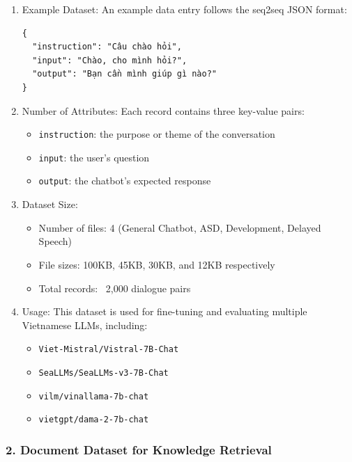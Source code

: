 \documentclass[conference]{IEEEtran}
\begin{document}
\begin{enumerate}[label=(\alph*)]
\item Example Dataset: 
An example data entry follows the seq2seq JSON format:

\begin{verbatim}
{
  "instruction": "Câu chào hỏi",
  "input": "Chào, cho mình hỏi?",
  "output": "Bạn cần mình giúp gì nào?"
}
\end{verbatim}

\item Number of Attributes: 
Each record contains three key-value pairs:
\begin{itemize}
    \item \texttt{instruction}: the purpose or theme of the conversation
    \item \texttt{input}: the user's question
    \item \texttt{output}: the chatbot's expected response
\end{itemize}

\item Dataset Size: 
\begin{itemize}
    \item Number of files: 4 (General Chatbot, ASD, Development, Delayed Speech)
    \item File sizes: 100KB, 45KB, 30KB, and 12KB respectively
    \item Total records: ~2,000 dialogue pairs
\end{itemize}

\item Usage: 
This dataset is used for fine-tuning and evaluating multiple Vietnamese LLMs, including:
\begin{itemize}
    \item \texttt{Viet-Mistral/Vistral-7B-Chat}
    \item \texttt{SeaLLMs/SeaLLMs-v3-7B-Chat}
    \item \texttt{vilm/vinallama-7b-chat}
    \item \texttt{vietgpt/dama-2-7b-chat}
\end{itemize}
\end{enumerate}
\subsubsection*{2. Document Dataset for Knowledge Retrieval}
\end{document}
